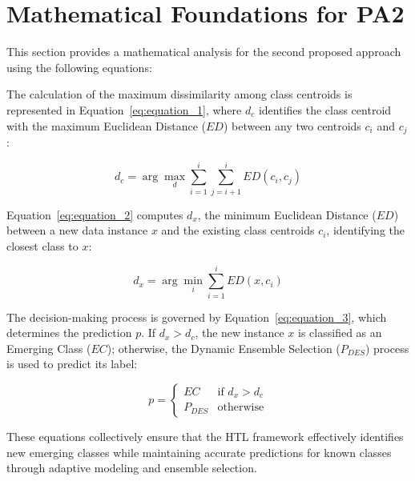 \section{Mathematical Foundations for PA2}

This section provides a mathematical analysis for the second proposed approach using the following equations:

The calculation of the maximum dissimilarity among class centroids is represented in Equation~\ref{eq:equation_1}, where \( d_c \) identifies the class centroid with the maximum Euclidean Distance (\( ED \)) between any two centroids \( c_i \) and \( c_j \):

\begin{equation}
	\label{eq:equation_1}
	d_c = \arg\max_d \sum_{i=1}^{i} \sum_{j=i+1}^{i}  ED(c_i, c_j)
\end{equation}

Equation~\ref{eq:equation_2} computes \( d_x \), the minimum Euclidean Distance (\( ED \)) between a new data instance \( x \) and the existing class centroids \( c_i \), identifying the closest class to \( x \):

\begin{equation}
	\label{eq:equation_2}
	d_x = \arg\min_i \sum_{i=1}^{i} ED(x, c_i)
\end{equation}

The decision-making process is governed by Equation~\ref{eq:equation_3}, which determines the prediction \( p \). If \( d_x > d_c \), the new instance \( x \) is classified as an Emerging Class (\( EC \)); otherwise, the Dynamic Ensemble Selection (\( P_{DES} \)) process is used to predict its label:

\begin{equation}
	\label{eq:equation_3}
	p=
	\begin{cases}
		EC & \text{if } d_x > d_c \\
		P_{DES} & \text{otherwise}
	\end{cases}
\end{equation}

These equations collectively ensure that the HTL framework effectively identifies new emerging classes while maintaining accurate predictions for known classes through adaptive modeling and ensemble selection.

